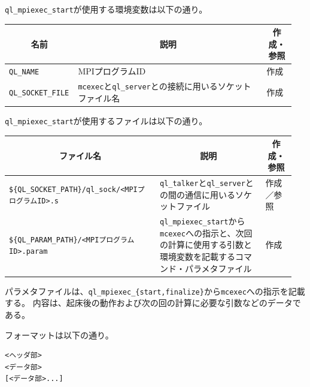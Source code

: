 \documentclass[twoside,11pt,fleqn]{book}
\begin{document}
\texttt{ql\_mpiexec\_start}が使用する環境変数は以下の通り。
\begin{table}[!ht]
\footnotesize
\begin{tabular}{|p{0.20\linewidth}|p{0.65\linewidth}|p{0.10\linewidth}|} \hline
\multicolumn{1}{|c}{\textbf{名前}}&\multicolumn{1}{|c|}{\textbf{説明}}&\multicolumn{1}{c|}{\textbf{作成・参照}}\\ \hline 
 \hline
\texttt{QL\_NAME}&MPIプログラムID&作成\\ \hline
\texttt{QL\_SOCKET\_FILE}&\texttt{mcexec}と\texttt{ql\_server}との接続に用いるソケットファイル名&作成\\ \hline
\end{tabular}
\vspace{-0em}
\end{table}
\FloatBarrier

\texttt{ql\_mpiexec\_start}が使用するファイルは以下の通り。
\begin{table}[!ht]
\footnotesize
\begin{tabular}{|p{0.50\linewidth}|p{0.35\linewidth}|p{0.10\linewidth}|} \hline
\multicolumn{1}{|c}{\textbf{ファイル名}}&\multicolumn{1}{|c|}{\textbf{説明}}&\multicolumn{1}{c|}{\textbf{作成・参照}}\\ \hline 
 \hline
\texttt{\$\{QL\_SOCKET\_PATH\}/ql\_sock/<MPIプログラムID>.s}&\texttt{ql\_talker}と\texttt{ql\_server}との間の通信に用いるソケットファイル&作成／参照\\ \hline
\texttt{\$\{QL\_PARAM\_PATH\}/<MPIプログラムID>.param}&\texttt{ql\_mpiexec\_start}から\texttt{mcexec}への指示と、次回の計算に使用する引数と環境変数を記載するコマンド・パラメタファイル&作成\\ \hline
\end{tabular}
\vspace{-0em}
\end{table}
\FloatBarrier

パラメタファイルは、\texttt{ql\_mpiexec\_\{start,finalize\}}から\texttt{mcexec}への指示を記載する。
内容は、起床後の動作および次の回の計算に必要な引数などのデータである。

フォーマットは以下の通り。
\begin{verbatim}
<ヘッダ部>
<データ部>
[<データ部>...]
\end{verbatim}
\end{document}

